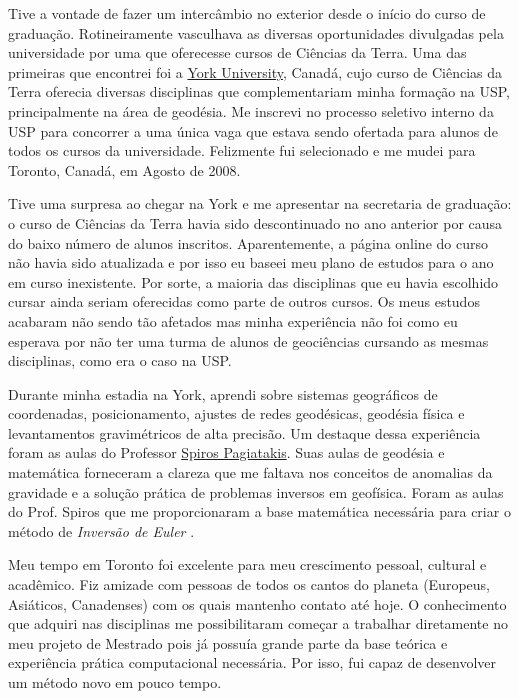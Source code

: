\documentclass[12pt,a4paper,oneside]{book}
\begin{document}
Tive a vontade de fazer um intercâmbio no exterior desde o início do curso de
graduação.
Rotineiramente vasculhava as diversas oportunidades divulgadas pela
universidade por uma que oferecesse cursos de Ciências da Terra.
Uma das primeiras que encontrei foi a \href{https://www.yorku.ca/}{York University},
Canadá, cujo curso de Ciências da Terra oferecia diversas disciplinas que
complementariam minha formação na USP, principalmente na área de geodésia.
Me inscrevi no processo seletivo interno da USP para concorrer a uma única vaga
que estava sendo ofertada para alunos de todos os cursos da universidade.
Felizmente fui selecionado e me mudei para Toronto, Canadá, em Agosto de 2008.

Tive uma surpresa ao chegar na York e me apresentar na secretaria de graduação:
o curso de Ciências da Terra havia sido descontinuado no ano anterior por causa
do baixo número de alunos inscritos.
Aparentemente, a página online do curso não havia sido atualizada e por isso
eu baseei meu plano de estudos para o ano em curso inexistente.
Por sorte, a maioria das disciplinas que eu havia escolhido cursar ainda
seriam oferecidas como parte de outros cursos.
Os meus estudos acabaram não sendo tão afetados mas minha experiência não foi
como eu esperava por não ter uma turma de alunos de geociências cursando as
mesmas disciplinas, como era o caso na USP.

Durante minha estadia na York, aprendi sobre sistemas geográficos de
coordenadas, posicionamento, ajustes de redes geodésicas, geodésia física e
levantamentos gravimétricos de alta precisão.
Um destaque dessa experiência foram as aulas do Professor
\href{https://www.yorku.ca/spiros/spiros.html}{Spiros Pagiatakis}.
Suas aulas de geodésia e matemática forneceram a clareza que me faltava nos
conceitos de anomalias da gravidade e a solução prática de problemas inversos
em geofísica.
Foram as aulas do Prof. Spiros que me proporcionaram a base matemática
necessária para criar o método de \textit{Inversão de Euler} \citep{Uieda2025}.

Meu tempo em Toronto foi excelente para meu crescimento pessoal, cultural e
acadêmico.
Fiz amizade com pessoas de todos os cantos do planeta (Europeus, Asiáticos,
Canadenses) com os quais mantenho contato até hoje.
O conhecimento que adquiri nas disciplinas me possibilitaram começar a
trabalhar diretamente no meu projeto de Mestrado pois já possuía grande parte
da base teórica e experiência prática computacional necessária.
Por isso, fui capaz de desenvolver um método novo em pouco tempo.
\end{document}
